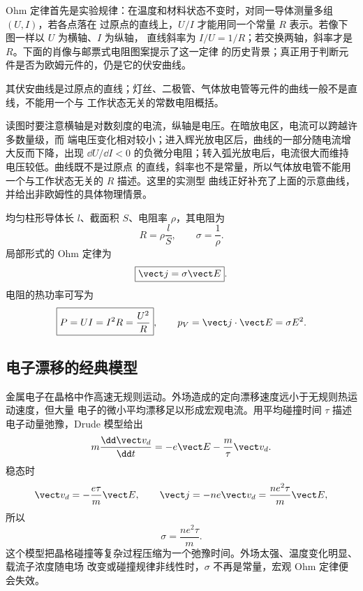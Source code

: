 Ohm 定律首先是实验规律：在温度和材料状态不变时，对同一导体测量多组 $(U,I)$，若各点落在
过原点的直线上，$U/I$ 才能用同一个常量 $R$ 表示。若像下图一样以 $U$ 为横轴、$I$ 为纵轴，
直线斜率为 $I/U=1/R$；若交换两轴，斜率才是 $R$。下面的肖像与邮票式电阻图案提示了这一定律
的历史背景；真正用于判断元件是否为欧姆元件的，仍是它的伏安曲线。

\ohmHistoryContextDiagram

其伏安曲线是过原点的直线；灯丝、二极管、气体放电管等元件的曲线一般不是直线，不能用一个与
工作状态无关的常数电阻概括。

\ivCharacteristicDiagram

\gasDischargeContextDiagram

读图时要注意横轴是对数刻度的电流，纵轴是电压。在暗放电区，电流可以跨越许多数量级，而
端电压变化相对较小；进入辉光放电区后，曲线的一部分随电流增大反而下降，出现
$\dd U/\dd I<0$ 的负微分电阻；转入弧光放电后，电流很大而维持电压较低。曲线既不是过原点
的直线，斜率也不是常量，所以气体放电管不能用一个与工作状态无关的 $R$ 描述。这里的实测型
曲线正好补充了上面的示意曲线，并给出非欧姆性的具体物理情景。

均匀柱形导体长 $l$、截面积 $S$、电阻率 $\rho$，其电阻为
\begin{equation}
  \boxed{R=\rho\frac lS},
  \qquad \sigma=\frac1\rho.
\end{equation}
局部形式的 Ohm 定律为
\begin{equation}
  \boxed{\vect j=\sigma\vect E}.
\end{equation}
电阻的热功率可写为
\begin{equation}
  \boxed{P=UI=I^2R=\frac{U^2}{R}},
  \qquad p_V=\vect j\cdot\vect E=\sigma E^2.
\end{equation}

\subsection*{电子漂移的经典模型}

金属电子在晶格中作高速无规则运动。外场造成的定向漂移速度远小于无规则热运动速度，但大量
电子的微小平均漂移足以形成宏观电流。用平均碰撞时间 $\tau$ 描述电子动量弛豫，Drude 模型给出
\begin{equation}
  m\frac{\dd\vect v_d}{\dd t}
  =-e\vect E-\frac m\tau\vect v_d.
\end{equation}
稳态时
\begin{equation}
  \vect v_d=-\frac{e\tau}{m}\vect E,
  \qquad
  \vect j=-ne\vect v_d=\frac{ne^2\tau}{m}\vect E,
\end{equation}
所以
\begin{equation}
  \boxed{\sigma=\frac{ne^2\tau}{m}}.
\end{equation}
这个模型把晶格碰撞等复杂过程压缩为一个弛豫时间。外场太强、温度变化明显、载流子浓度随电场
改变或碰撞规律非线性时，$\sigma$ 不再是常量，宏观 Ohm 定律便会失效。

